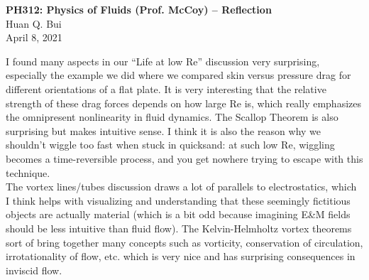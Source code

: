 \documentclass[11pt]{article}
\begin{document}
\begin{center}
{\large \bf PH312: Physics of Fluids (Prof. McCoy) -- Reflection}\\
{ Huan Q. Bui}\\
April 8, 2021
\end{center}



I found many aspects in our ``Life at low Re'' discussion very surprising, especially the example we did where we compared skin versus pressure drag for different orientations of a flat plate. It is very interesting that the relative strength of these drag forces depends on how large Re is, which really emphasizes the omnipresent nonlinearity in fluid dynamics. The Scallop Theorem is also surprising but makes intuitive sense. I think it is also the reason why we shouldn't wiggle too fast when stuck in quicksand: at such low Re, wiggling becomes a time-reversible process, and you get nowhere trying to escape with this technique. \\

The vortex lines/tubes discussion draws a lot of parallels to electrostatics, which I think helps with visualizing and understanding that these seemingly fictitious objects are actually material (which is a bit odd because imagining E\&M fields should be less intuitive than fluid flow). The Kelvin-Helmholtz vortex theorems sort of bring together many concepts such as vorticity, conservation of circulation, irrotationality of flow, etc.  which is very nice and has surprising consequences in inviscid flow. 

  
\end{document}
